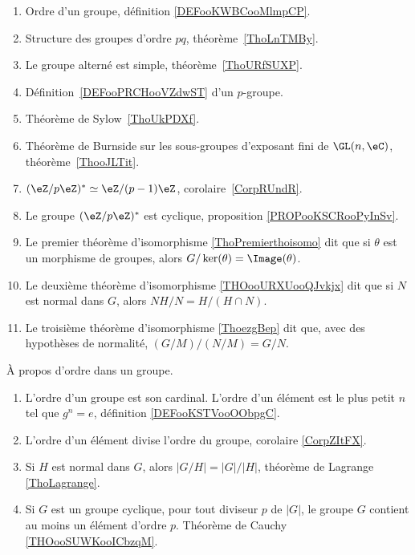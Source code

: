 	\label{THEMEooTheorieGroupes}
\begin{enumerate}
	\item Ordre d'un groupe, définition \ref{DEFooKWBCooMlmpCP}.
	\item Structure des groupes d'ordre \( pq\), théorème~\ref{ThoLnTMBy}.
	\item Le groupe alterné est simple, théorème~\ref{ThoURfSUXP}.
	\item Définition~\ref{DEFooPRCHooVZdwST} d'un \( p\)-groupe.
	\item Théorème de Sylow~\ref{ThoUkPDXf}.
	\item Théorème de Burnside sur les sous-groupes d'exposant fini de \( \GL(n,\eC)\), théorème~\ref{ThooJLTit}.
	\item \( (\eZ/p\eZ)^*\simeq \eZ/(p-1)\eZ\), corolaire~\ref{CorpRUndR}.
	\item
	      Le groupe \( (\eZ/p\eZ)^*\) est cyclique, proposition \ref{PROPooKSCRooPyInSv}.
	\item Le premier théorème d'isomorphisme \ref{ThoPremierthoisomo} dit que si \( \theta\) est un morphisme de groupes, alors  \( G/\ker(\theta)=\Image(\theta)\).
	\item Le deuxième théorème d'isomorphisme \ref{THOooURXUooQJvkjx} dit que si \( N\) est normal dans \( G\), alors \( NH/N=H/(H\cap N)\).
	\item Le troisième théorème d'isomorphisme \ref{ThoezgBep} dit que, avec des hypothèses de normalité, \( (G/M)/(N/M)=G/N\).
\end{enumerate}

À propos d'ordre dans un groupe.
\begin{enumerate}
	\item
	      L'ordre d'un groupe est son cardinal. L'ordre d'un élément est le plus petit \( n\) tel que \( g^n=e\), définition \ref{DEFooKSTVooOObpgC}.
	\item
	      L'ordre d'un élément divise l'ordre du groupe, corolaire \ref{CorpZItFX}.
	\item
	      Si \( H\) est normal dans \( G\), alors \( | G/H |=| G |/| H |\), théorème de Lagrange \ref{ThoLagrange}.
	\item
	      Si \( G\) est un groupe cyclique, pour tout diviseur \( p\) de \( | G |\), le groupe \( G\) contient au moins un élément d'ordre \( p\). Théorème de Cauchy \ref{THOooSUWKooICbzqM}.
\end{enumerate}
